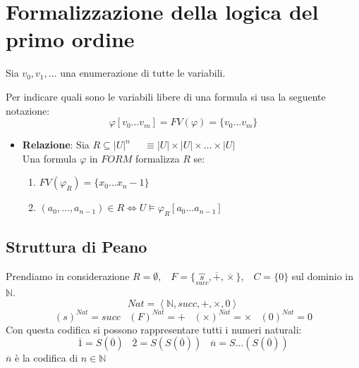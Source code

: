\documentclass{article}
\theoremstyle{break}
\theoremstyle{break}
\theoremstyle{break}
\theoremstyle{break}
\begin{document}
  \section{Formalizzazione della logica del primo ordine}
  Sia \( v_0, v_1, \ldots \) una enumerazione di tutte le variabili.
  \begin{define}[Notazione]
    Per indicare quali sono le variabili libere di una formula si usa la seguente notazione:
    \[
      \varphi[v_0 \ldots v_m] = FV(\varphi ) = \{v_0 \ldots v_m\} 
    \] 

  \end{define}
  \begin{itemize}
    \item \textbf{Relazione}: Sia \( R \subseteq |U|^n \;\;\;\;\; \equiv |U| \times |U| \times \ldots \times |U|\) \\
      Una formula \( \varphi  \) in \( FORM \) formalizza \( R \) se:
      \begin{enumerate}
        \item \( FV(\varphi_R) = \{x_0 \ldots x_n-1\}  \) 
        \item \( (a_0, \ldots, a_{n-1}) \in R \Leftrightarrow U \models \varphi_R[a_0 \ldots a_{n-1}] \) 
      \end{enumerate}
  \end{itemize}

  \subsection{Struttura di Peano}
  Prendiamo in considerazione \( R = \emptyset,\;\;\;F = \{\overbrace{s}_{succ}, \overline{+}, \overline{\times}\},\;\;\; C = \{0\}\)
  sul dominio in \( \mathbb{N} \).
  \[
    Nat = \left< \mathbb{N}, succ, +, \times , 0 \right>
  \] 
  \[
    (s)^{Nat} = succ \;\;\; (F)^{Nat} = + \;\;\; (\times )^{Nat} = \times \;\;\; (0)^{Nat} = 0
  \] 
  Con questa codifica si possono rappresentare tutti i numeri naturali:
  \[
    \overline{1} = S(\overline{0}) \;\;\; \overline{2} = S(S(\overline{0})) \;\;\; \overline{n} = S...(S(\overline{0}))
  \] 
  \( \overline{n} \) è la codifica di \( n \in  \mathbb{N} \) 
\end{document}
